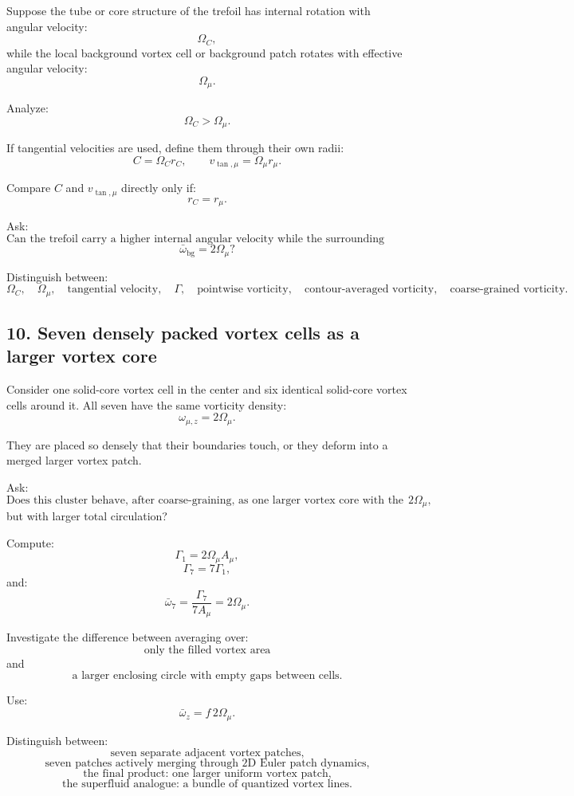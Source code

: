 \documentclass[11pt,a4paper]{article}
\begin{document}
Suppose the tube or core structure of the trefoil has internal rotation with angular velocity:
\[
\Omega_C,
\]
while the local background vortex cell or background patch rotates with effective angular velocity:
\[
\Omega_{\mu}.
\]

Analyze:
\[
\Omega_C>\Omega_{\mu}.
\]

If tangential velocities are used, define them through their own radii:
\[
C=\Omega_C r_C,
\qquad
v_{\tan,\mu}=\Omega_{\mu}r_{\mu}.
\]

Compare \(C\) and \(v_{\tan,\mu}\) directly only if:
\[
r_C=r_{\mu}.
\]

Ask:
\[
\text{Can the trefoil carry a higher internal angular velocity while the surrounding coarse-grained background vorticity remains}
\]
\[
\bar{\omega}_{\mathrm{bg}}=2\Omega_{\mu}?
\]

Distinguish between:
\[
\Omega_C,
\quad
\Omega_{\mu},
\quad
\text{tangential velocity},
\quad
\Gamma,
\quad
\text{pointwise vorticity},
\quad
\text{contour-averaged vorticity},
\quad
\text{coarse-grained vorticity}.
\]

\subsection{10. Seven densely packed vortex cells as a larger vortex core}

Consider one solid-core vortex cell in the center and six identical solid-core vortex cells around it. All seven have the same vorticity density:
\[
\omega_{\mu,z}=2\Omega_{\mu}.
\]

They are placed so densely that their boundaries touch, or they deform into a merged larger vortex patch.

Ask:
\[
\text{Does this cluster behave, after coarse-graining, as one larger vortex core with the same effective vorticity density }2\Omega_{\mu},
\]
but with larger total circulation?

Compute:
\[
\Gamma_1=2\Omega_{\mu}A_{\mu},
\]
\[
\Gamma_7=7\Gamma_1,
\]
and:
\[
\bar{\omega}_7
=
\frac{\Gamma_7}{7A_{\mu}}
=
2\Omega_{\mu}.
\]

Investigate the difference between averaging over:
\[
\text{only the filled vortex area}
\]
and
\[
\text{a larger enclosing circle with empty gaps between cells.}
\]

Use:
\[
\bar{\omega}_z=f\,2\Omega_{\mu}.
\]

Distinguish between:
\[
\text{seven separate adjacent vortex patches,}
\]
\[
\text{seven patches actively merging through 2D Euler patch dynamics,}
\]
\[
\text{the final product: one larger uniform vortex patch,}
\]
\[
\text{the superfluid analogue: a bundle of quantized vortex lines.}
\]
\end{document}
